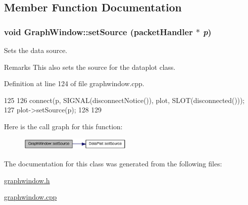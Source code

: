 \subsection{Member Function Documentation}
\hypertarget{classGraphWindow_a07a46e21184c287ba49db8145047e420}{
\subsubsection[{setSource}]{\setlength{\rightskip}{0pt plus 5cm}void GraphWindow::setSource ({\bf packetHandler} $\ast$ {\em p})}}
\label{classGraphWindow_a07a46e21184c287ba49db8145047e420}


Sets the data source. 

\begin{DoxyRemark}{Remarks}
This also sets the source for the dataplot class. 
\end{DoxyRemark}


Definition at line 124 of file graphwindow.cpp.




\begin{DoxyCode}
125 {
126     connect(p, SIGNAL(disconnectNotice()), plot, SLOT(disconnected()));
127     plot->setSource(p);
128 
129 }
\end{DoxyCode}




Here is the call graph for this function:\nopagebreak
\begin{figure}[H]
\begin{center}
\leavevmode
\includegraphics[width=155pt]{classGraphWindow_a07a46e21184c287ba49db8145047e420_cgraph}
\end{center}
\end{figure}




The documentation for this class was generated from the following files:\begin{DoxyCompactItemize}
\item 
\hyperlink{graphwindow_8h}{graphwindow.h}\item 
\hyperlink{graphwindow_8cpp}{graphwindow.cpp}\end{DoxyCompactItemize}
